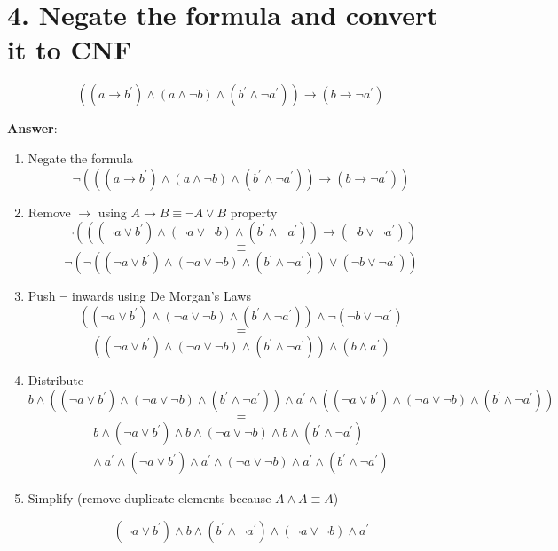 \documentclass[a4paper, 14pt]{report}
\newcommand{\answer}[1]{%
	\begin{flushleft}
		\textbf{Answer}:\\
			#1
	\end{flushleft}}
\newcommand{\question}[1]{\section*{#1}}
\begin{document}
	\question{4. Negate the formula and convert it to CNF} %

	\[ ((a \rightarrow b^\prime) \wedge (a \wedge \neg b) \wedge (b^\prime \wedge \neg a^\prime)) \rightarrow (b \rightarrow \neg a^\prime) \]

	\answer{%
	\begin{enumerate}		

		\item Negate the formula \\
			\[ \neg (((a \rightarrow b^\prime) \wedge (a \wedge \neg b) \wedge (b^\prime \wedge \neg a^\prime)) \rightarrow (b \rightarrow \neg a^\prime)) \] 
	  
		\item Remove $\rightarrow$ using $A \rightarrow B \equiv \neg A \vee B$ property \\
			\[ \neg (((\neg a \vee b^\prime) \wedge (\neg a \vee \neg b) \wedge (b^\prime \wedge \neg a^\prime)) \rightarrow (\neg b \vee \neg a^\prime)) \]  
			\[ \equiv \]
			\[ \neg (\neg ((\neg a \vee b^\prime) \wedge (\neg a \vee \neg b) \wedge (b^\prime \wedge \neg a^\prime)) \vee (\neg b \vee \neg a^\prime)) \] 

		\item Push $\neg$ inwards using De Morgan's Laws
			\[ ((\neg a \vee b^\prime) \wedge (\neg a \vee \neg b) \wedge (b^\prime \wedge \neg a^\prime)) \wedge \neg (\neg b \vee \neg a^\prime) \] 
			\[ \equiv \]
			\[ ((\neg a \vee b^\prime) \wedge (\neg a \vee \neg b) \wedge (b^\prime \wedge \neg a^\prime)) \wedge (b \wedge a^\prime) \] 

		\item Distribute
			\[ b \wedge ((\neg a \vee b^\prime) \wedge (\neg a \vee \neg b) \wedge (b^\prime \wedge \neg a^\prime)) \wedge a^\prime \wedge  ((\neg a \vee b^\prime) \wedge (\neg a \vee \neg b) \wedge (b^\prime \wedge \neg a^\prime)) \] 
			\[ \equiv \]
			\[ 
				\begin{split}
					b \wedge (\neg a \vee b^\prime) \wedge b \wedge (\neg a \vee \neg b) \wedge b \wedge (b^\prime \wedge \neg a^\prime) \\
					\wedge\  
					a^\prime \wedge (\neg a \vee b^\prime) \wedge a^\prime \wedge (\neg a \vee \neg b) \wedge a^\prime \wedge (b^\prime \wedge \neg a^\prime)
			 \end{split}
			\] 

			\item Simplify (remove duplicate elements because $ A \wedge A \equiv A$)

			\[ (\neg a \vee b^\prime) \wedge b \wedge (b^\prime \wedge \neg a^\prime) \wedge (\neg a \vee \neg b) \wedge a^\prime  \] 

	\end{enumerate}		

	\hline
}
\end{document}
